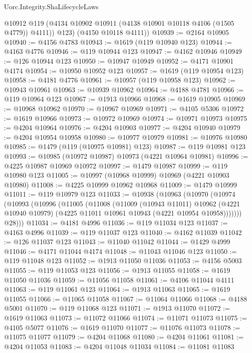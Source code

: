 \begin{lexlean}{Uorc.Integrity.ShaLifecycleLaws}
\begin{coremodule}
          @10912
          @119
          (@4134 @10902 @10911 (@4138 @10901 @10118 @4106 (@1505 @4779)) @4111))
        @123)
      (@4150 @10118 @4111))
@10939 := @2164 @10905
@10940 := @4156 @4783
@10943 := @1619 (@119 @10940 @123)
@10944 := @4163 @4776
@10946 := @119 @10944 @123
@10947 := @4162 @10946
@10949 := @126 @10944 @123
@10950 := @10947 @10949
@10952 := @4171 @10901 @4174
@10954 := @10950 @10952 @123
@10957 := @1619 (@119 @10954 @123)
@10958 := @4181 @4776
@10961 := @10957 (@119 @10958 @123)
@10962 := @10943 @10961
@10963 := @10939 @10962
@10964 := @4188 @4781
@10966 := @119 @10964 @123
@10967 := @1913 @10966
@10968 := @1619 @10905
@10969 := @10968 @10962
@10970 := @10967 @10969
@10971 := @4105 @5306
@10972 := @1619 @10966
@10973 := @10972 @10969
@10974 := @10971 @10973
@10975 := @4204 @10964
@10976 := @4204 @10903
@10977 := @4204 @10940
@10979 := @4204 @10954 @10958
@10980 := @10977 @10979
@10981 := @10976 @10980
@10985 := @1479 (@119 (@10975 @10981) @123)
@10987 := @119 @10981 @123
@10993 := @10985 (@10972 @10987) @10973 (@4221 @10964 @10981)
@10996 := @4225 @10987 @10969 @10972
@10997 := @1479 @10987
@10999 := @119 @10980 @123
@11005 := @10997 (@10968 @10999) @10969 (@4221 @10903 @10980)
@11008 := @4225 @10999 @10962 @10968
@11009 := @1479 @10999
@11011 := @119 @10979 @123
@11033 := @10938
    (@10963
      (@10970
        (@10974
          (@10993
            (@10996
              (@11005
                (@11008
                  (@11009
                    (@10943 @11011)
                    @10962
                    (@4221 @10940 @10979)
                    (@4225 @11011 @10961 @10943 (@4221 @10954 @10958)))))))
          @28)))
@11034 := @4181 @4996
@11036 := @119 @11034 @123
@11037 := @4163 @4996
@11039 := @119 @11037 @123
@11040 := @4162 @11039
@11042 := @126 @11037 @123
@11043 := @11040 @11042
@11044 := @1429 @4999
@11046 := @4171 @11044 @4174
@11048 := @11043 @11046 @123
@11050 := @119 @11048 @123
@11052 := @1913 @11050 @11036
@11053 := @4156 @5003
@11055 := @119 @11053 @123
@11056 := @1913 @11055
@11058 := @1619 @11050 @11036
@11059 := @11056 @11058
@11061 := @4106 @11044 @4111
@11063 := @119 @11061 @123
@11064 := @1913 @11063
@11065 := @1619 @11055
@11066 := @11065 @11058
@11067 := @11064 @11066
@11068 := @4188 @5001
@11070 := @119 @11068 @123
@11071 := @1913 @11070
@11072 := @1619 @11063
@11073 := @11072 @11066
@11074 := @11071 @11073
@11075 := @4105 @5077
@11076 := @1619 @11070
@11077 := @11076 @11073
@11078 := @11075 @11077
@11079 := @4204 @11068
@11080 := @4204 @11061
@11081 := @4204 @11053
@11083 := @4204 @11048 @11034
@11084 := @11081 @11083

\end{coremodule}
\end{lexlean}
